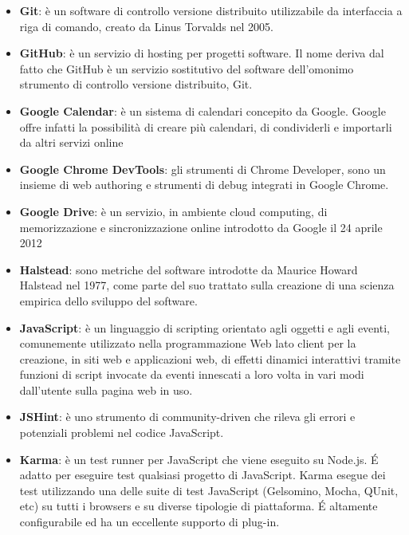 \begin{itemize}
\item[] \textbf{Git}: è un software di controllo versione distribuito utilizzabile da interfaccia a riga di comando, creato da Linus Torvalds nel 2005.
\item[] \textbf{GitHub}: è un servizio di hosting per progetti software. Il nome deriva dal fatto che GitHub è un servizio sostitutivo del software dell'omonimo strumento di controllo versione distribuito, Git.
\item[] \textbf{Google Calendar}: è un sistema di calendari concepito da Google. Google offre infatti la possibilità di creare più calendari, di condividerli e importarli da altri servizi online
\item[] \textbf{Google Chrome DevTools}: gli strumenti di Chrome Developer, sono un insieme di web authoring e strumenti di debug integrati in Google Chrome.
\item[] \textbf{Google Drive}: è un servizio, in ambiente cloud computing, di memorizzazione e sincronizzazione online introdotto da Google il 24 aprile 2012
\end{itemize}
\newpage

\begin{itemize}
\item[] \textbf{Halstead}: sono metriche del software introdotte da Maurice Howard Halstead nel 1977, come parte del suo trattato sulla creazione di una scienza empirica dello sviluppo del software.
\end{itemize}
\newpage

\begin{itemize}
\item[] \textbf{JavaScript}: è un linguaggio di scripting orientato agli oggetti e agli eventi, comunemente utilizzato nella programmazione Web lato client per la creazione, in siti web e applicazioni web, di effetti dinamici interattivi tramite funzioni di script invocate da eventi innescati a loro volta in vari modi dall'utente sulla pagina web in uso.
\item[] \textbf{JSHint}: è uno strumento di community-driven che rileva gli errori e potenziali problemi nel codice JavaScript.
\end{itemize}
\newpage

\begin{itemize}
\item[] \textbf{Karma}: è un test runner per JavaScript che viene eseguito su Node.js. \'E adatto per eseguire test qualsiasi progetto di JavaScript. Karma esegue dei test utilizzando una delle suite di test JavaScript (Gelsomino, Mocha, QUnit, etc) su tutti i browsers e su diverse tipologie di piattaforma. \'E altamente configurabile ed ha un eccellente supporto di plug-in.
\end{itemize}
\newpage

